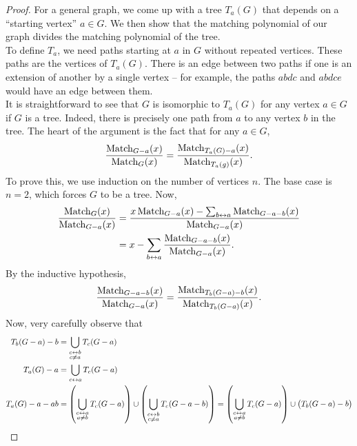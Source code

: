 \begin{proof}
		For a general graph, we come up with a tree $T_a(G)$ that depends on a ``starting vertex'' $a \in G$. We then show that the matching polynomial of our graph divides the matching polynomial of the tree.\\
		To define $T_a$, we need paths starting at $a$ in $G$ without repeated vertices. These paths are the vertices of $T_a(G)$. There is an edge between two paths if one is an extension of another by a single vertex -- for example, the paths $abdc$ and $abdce$ would have an edge between them.\\
		It is straightforward to see that $G$ is isomorphic to $T_a(G)$ for any vertex $a \in G$ if $G$ is a tree. Indeed, there is precisely one path from $a$ to any vertex $b$ in the tree.
		The heart of the argument is the fact that for any $a\in G$,
		\begin{equation}
			\frac{\operatorname{Match}_{G - a}(x)}{\operatorname{Match}_G(x)} = \frac{\operatorname{Match}_{T_a(G)-a}(x)}{\operatorname{Match}_{T_a(g)}(x)}. \label{eqnmatch1}
		\end{equation}
		To prove this, we use induction on the number of vertices $n$. The base case is $n=2$, which forces $G$ to be a tree. Now,
		\begin{align*}
			\frac{\operatorname{Match}_G(x)}{\operatorname{Match}_{G-a}(x)} &= \frac{x\operatorname{Match}_{G-a}(x) - \sum_{b\leftrightarrow a} \operatorname{Match}_{G-a-b}(x)}{\operatorname{Match}_{G-a}(x)} \\
				&= x - \sum_{b \leftrightarrow a} \frac{\operatorname{Match}_{G-a-b}(x)}{\operatorname{Match}_{G-a}(x)}.
		\end{align*}
		By the inductive hypothesis,
		\begin{equation}
			\frac{\operatorname{Match}_{G-a-b}(x)}{\operatorname{Match}_{G-a}(x)} =  \frac{\operatorname{Match}_{T_b(G-a)-b}(x)}{\operatorname{Match}_{T_b(G-a)}(x)}. \label{eqnmatch2}
		\end{equation}
		Now, very carefully observe that
		\begin{align*}
			T_b(G-a)-b &= \bigcup_{\substack{c \leftrightarrow b \\ c \ne a}} T_c(G-a) \\
			T_a(G)-a &= \bigcup_{c\leftrightarrow a} T_c(G-a) \\
			T_a(G)-a-ab &= \left(\bigcup_{\substack{c\leftrightarrow a \\ a \ne b}} T_c(G-a)\right) \cup \left(\bigcup_{\substack{c\leftrightarrow b \\ c \ne a}} T_c(G-a-b)\right) = \left(\bigcup_{\substack{c\leftrightarrow a \\ a \ne b}} T_c(G-a)\right) \cup \left(T_b(G-a)-b\right)
		\end{align*}


\end{proof}
